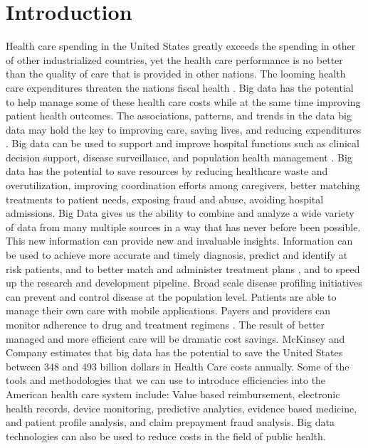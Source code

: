 \documentclass[sigconf]{acmart}
\begin{document}
\section{Introduction}
Health care spending in the United States greatly exceeds the spending in other of other industrialized countries, yet the health care performance is no better than the quality of care that is provided in other nations. The looming health care expenditures threaten the nations fiscal health \cite{springer}.  Big data has the potential to help manage some of these health care costs while at the same time improving patient health outcomes. The associations, patterns, and trends in the data big data may hold the key to improving care, saving lives, and reducing expenditures \cite{springer}. Big data can be used to support and improve hospital functions such as clinical decision support, disease surveillance, and population health management \cite{springer}. Big data has the potential to save resources by reducing healthcare waste and overutilization, improving coordination efforts among caregivers, better matching treatments to patient needs, exposing fraud and abuse, avoiding hospital admissions.  Big Data gives us the ability to combine and analyze a wide variety of data from many multiple sources in a way that has never before been possible. This new information can provide new and invaluable insights. Information can be used to achieve more accurate and timely diagnosis, predict and identify at risk patients, and to better match and administer treatment plans \cite{www-google-McDonald}, and to speed up the research and development pipeline. Broad scale disease profiling initiatives can prevent and control disease at the population level. Patients are able to manage their own care with mobile applications. Payers and providers can monitor adherence to drug and treatment regimens \cite{springer}.  
The result of better managed and more efficient care will be dramatic cost savings. McKinsey and Company estimates that big data has the potential to save the United States between 348 and 493 billion dollars in Health Care costs annually\cite{www-google-CIO}.
Some of the tools and methodologies that we can use to introduce efficiencies into the American health care system include: Value based reimbursement, electronic health records, device monitoring, predictive analytics, evidence based medicine, and patient profile analysis, and claim prepayment fraud analysis.  Big data technologies can also be used to reduce costs in the field of public health. 
\end{document}
